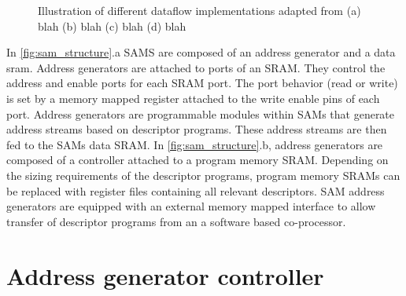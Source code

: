 \begin{figure}
    \centering
    \caption{Illustration of different dataflow implementations adapted from \cite{dnn_df_overrated} (a) blah (b) blah (c) blah (d) blah}
    \label{fig:sam_structure}
\end{figure}

In \autoref{fig:sam_structure}.a SAMS are composed of an address generator and a
data sram. Address generators are attached to ports of an SRAM. They control the
address and enable ports for each SRAM port. The port behavior (read or write)
is set by a memory mapped register attached to the write enable pins of each
port. Address generators are programmable modules within SAMs that generate address
streams based on descriptor programs. These address streams are then fed to the
SAMs data SRAM. In \autoref{fig:sam_structure}.b, address generators are
composed of a controller attached to a program memory SRAM. Depending on the
sizing requirements of the descriptor programs, program memory SRAMs can be
replaced with register files containing all relevant descriptors. SAM address
generators are equipped with an external memory mapped interface to allow
transfer of descriptor programs from an a software based co-processor.

\section{Address generator controller}
\label{chap:sams:controller}

